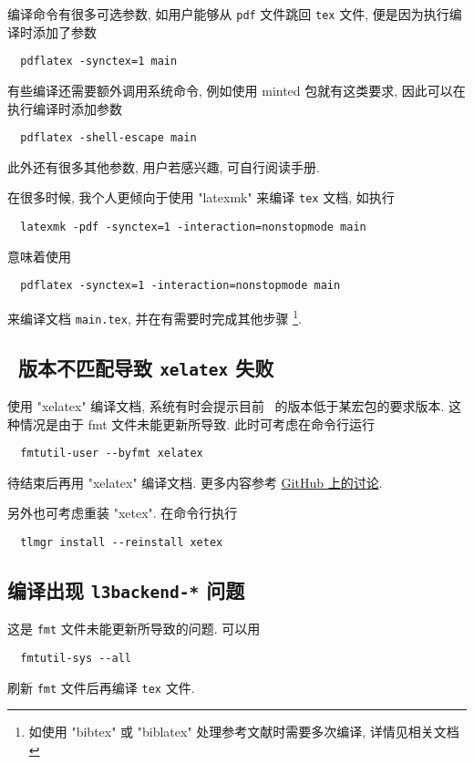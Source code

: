 编译命令有很多可选参数, 如用户能够从 \texttt{pdf} 文件跳回 \texttt{tex} 文件,
便是因为执行编译时添加了参数
\begin{lstlisting}
  pdflatex -synctex=1 main
\end{lstlisting}
有些编译还需要额外调用系统命令,
例如使用 \textsf{minted} 包就有这类要求,
因此可以在执行编译时添加参数
\begin{lstlisting}
  pdflatex -shell-escape main
\end{lstlisting}
此外还有很多其他参数, 用户若感兴趣, 可自行阅读手册.

在很多时候, 我个人更倾向于使用 "latexmk" 来编译 \texttt{tex} 文档,
如执行
\begin{lstlisting}
  latexmk -pdf -synctex=1 -interaction=nonstopmode main
\end{lstlisting}
意味着使用
\begin{lstlisting}
  pdflatex -synctex=1 -interaction=nonstopmode main
\end{lstlisting}
来编译文档 \texttt{main.tex}, 并在有需要时完成其他步骤%
\footnote{如使用 "bibtex" 或 "biblatex" 处理参考文献时需要多次编译,
详情见相关文档}.

\subsection{\LaTeXe\ 版本不匹配导致 \texttt{xelatex} 失败}

使用 "xelatex" 编译文档,
系统有时会提示目前 \LaTeXe\ 的版本低于某宏包的要求版本.
这种情况是由于 \textsf{fmt} 文件未能更新所导致.
此时可考虑在命令行运行
\begin{lstlisting}
  fmtutil-user --byfmt xelatex
\end{lstlisting}
待结束后再用 "xelatex" 编译文档.
更多内容参考
\href{https://github.com/CTeX-org/forum/issues/70}{GitHub 上的讨论}.

另外也可考虑重装 "xetex".
在命令行执行
\begin{lstlisting}
  tlmgr install --reinstall xetex
\end{lstlisting}

\subsection{编译出现 \texttt{l3backend-*} 问题}

这是 \texttt{fmt} 文件未能更新所导致的问题.
可以用
\begin{lstlisting}
  fmtutil-sys --all
\end{lstlisting}
刷新 \texttt{fmt} 文件后再编译 \texttt{tex} 文件.

